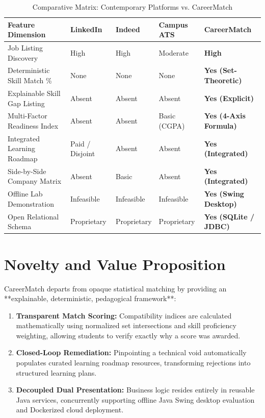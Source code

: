 \documentclass[11pt,a4paper]{report}
\begin{document}
\begin{table}[H]
    \centering
    \caption{Comparative Matrix: Contemporary Platforms vs. CareerMatch}
    \label{tab:lit_comparison}
    \small
    \begin{tabular}{p{4.2cm}p{2.2cm}p{2.2cm}p{2.5cm}p{2.5cm}}
        \toprule
        \textbf{Feature Dimension} & \textbf{LinkedIn} & \textbf{Indeed} & \textbf{Campus ATS} & \textbf{CareerMatch} \\
        \midrule
        Job Listing Discovery & High & High & Moderate & \textbf{High} \\
        Deterministic Skill Match \% & None & None & None & \textbf{Yes (Set-Theoretic)} \\
        Explainable Skill Gap Listing & Absent & Absent & Absent & \textbf{Yes (Explicit)} \\
        Multi-Factor Readiness Index & Absent & Absent & Basic (CGPA) & \textbf{Yes (4-Axis Formula)} \\
        Integrated Learning Roadmap & Paid / Disjoint & Absent & Absent & \textbf{Yes (Integrated)} \\
        Side-by-Side Company Matrix & Absent & Basic & Absent & \textbf{Yes (Integrated)} \\
        Offline Lab Demonstration & Infeasible & Infeasible & Infeasible & \textbf{Yes (Swing Desktop)} \\
        Open Relational Schema & Proprietary & Proprietary & Proprietary & \textbf{Yes (SQLite / JDBC)} \\
        \bottomrule
    \end{tabular}
\end{table}

\section{Novelty and Value Proposition}
CareerMatch departs from opaque statistical matching by providing an **explainable, deterministic, pedagogical framework**:
\begin{enumerate}
    \item \textbf{Transparent Match Scoring:} Compatibility indices are calculated mathematically using normalized set intersections and skill proficiency weighting, allowing students to verify exactly why a score was awarded.
    \item \textbf{Closed-Loop Remediation:} Pinpointing a technical void automatically populates curated learning roadmap resources, transforming rejections into structured learning plans.
    \item \textbf{Decoupled Dual Presentation:} Business logic resides entirely in reusable Java services, concurrently supporting offline Java Swing desktop evaluation and Dockerized cloud deployment.
\end{enumerate}
\end{document}
